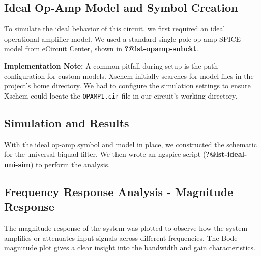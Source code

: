 \documentclass[
  letterpaper,
  DIV=11,
  numbers=noendperiod]{scrreprt}
\begin{document}
\subsection{Ideal Op-Amp Model and Symbol
Creation}\label{ideal-op-amp-model-and-symbol-creation}

To simulate the ideal behavior of this circuit, we first required an
ideal operational amplifier model. We used a standard single-pole op-amp
SPICE model from eCircuit Center, shown in \textbf{?@lst-opamp-subckt}.

\textbf{Implementation Note:} A common pitfall during setup is the path
configuration for custom models. Xschem initially searches for model
files in the project's home directory. We had to configure the
simulation settings to ensure Xschem could locate the
\texttt{OPAMP1.cir} file in our circuit's working directory.

\subsection{Simulation and Results}\label{simulation-and-results}

With the ideal op-amp symbol and model in place, we constructed the
schematic for the universal biquad filter. We then wrote an ngspice
script (\textbf{?@lst-ideal-uni-sim}) to perform the analysis.

\subsection{Frequency Response Analysis - Magnitude
Response}\label{frequency-response-analysis---magnitude-response}

The magnitude response of the system was plotted to observe how the
system amplifies or attenuates input signals across different
frequencies. The Bode magnitude plot gives a clear insight into the
bandwidth and gain characteristics.
\end{document}
